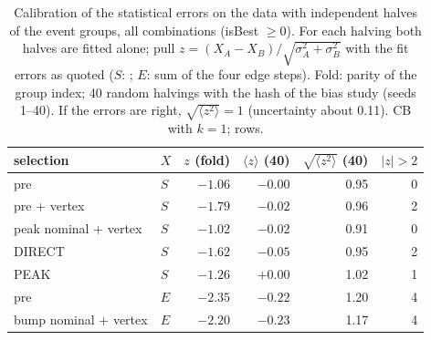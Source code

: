 \begin{table}[H]\centering\small
\caption{Calibration of the statistical errors on the data with independent halves of the event groups, all combinations (isBest $\geq0$). For each halving both halves are fitted alone; pull $z=(X_A-X_B)/\sqrt{\sigma_A^2+\sigma_B^2}$ with the fit errors as quoted ($S$: \Pmain; $E$: sum of the four edge steps). Fold: parity of the group index; 40 random halvings with the hash of the bias study (seeds 1--40). If the errors are right, $\sqrt{\langle z^2\rangle}=1$ (uncertainty about 0.11). CB with $k=1$; rows.}
\label{tab:fix_stat}
\begin{tabular}{@{}l l r r r r@{}}
\toprule
selection & $X$ & $z$ (fold) & $\langle z\rangle$ (40) & $\sqrt{\langle z^2\rangle}$ (40) & $|z|>2$ \\
\midrule
pre & $S$ & $-1.06$ & $-0.00$ & 0.95 & 0 \\
pre + vertex & $S$ & $-1.79$ & $-0.02$ & 0.96 & 2 \\
peak nominal + vertex & $S$ & $-1.02$ & $-0.02$ & 0.91 & 0 \\
DIRECT & $S$ & $-1.62$ & $-0.05$ & 0.95 & 2 \\
PEAK & $S$ & $-1.26$ & $+0.00$ & 1.02 & 1 \\
pre & $E$ & $-2.35$ & $-0.22$ & 1.20 & 4 \\
bump nominal + vertex & $E$ & $-2.20$ & $-0.23$ & 1.17 & 4 \\
\bottomrule
\end{tabular}
\end{table}
